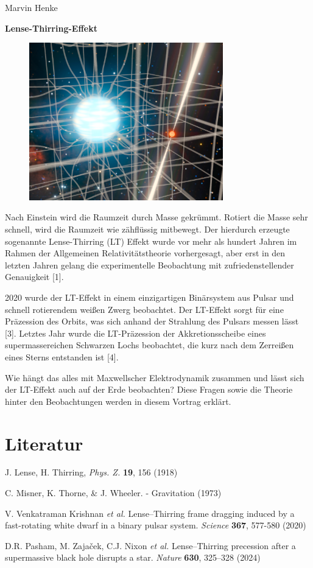 \documentclass[12pt,a4paper]{article}
\begin{document}
	Marvin Henke
	\begin{center}
		\LARGE \textbf{Lense-Thirring-Effekt}
	\end{center}
	
	\begin{figure}[ht]
		\centering
		\includegraphics[width=0.75\textwidth]{../lense_thirring_edited.png}
	\end{figure}
	
	\noindent
	Nach Einstein wird die Raumzeit durch Masse gekrümmt. Rotiert die Masse sehr schnell, wird die Raumzeit wie zähflüssig mitbewegt. Der hierdurch erzeugte sogenannte Lense-Thirring (LT) Effekt wurde vor mehr als hundert Jahren im Rahmen der Allgemeinen Relativitätstheorie vorhergesagt, aber erst in den letzten Jahren gelang die experimentelle Beobachtung mit zufriedenstellender Genauigkeit [1].
	
	2020 wurde der LT-Effekt in einem einzigartigen Binärsystem aus Pulsar und schnell rotierendem weißen Zwerg beobachtet. Der LT-Effekt sorgt für eine Präzession des Orbits, was sich anhand der Strahlung des Pulsars messen lässt [3].
	Letztes Jahr wurde die LT-Präzession der Akkretionsscheibe eines supermassereichen Schwarzen
	Lochs beobachtet, die kurz nach dem Zerreißen eines Sterns entstanden ist [4].
	
	Wie hängt das alles mit Maxwellscher Elektrodynamik zusammen und lässt sich der LT-Effekt auch auf der Erde beobachten? Diese Fragen sowie die Theorie hinter den Beobachtungen werden in diesem Vortrag erklärt.
	
	\section*{Literatur}
	\begin{enumerate}[label={[\arabic*]}]
		\item J. Lense, H. Thirring, \textit{Phys. Z.} \textbf{19}, 156 (1918)
		\item C. Misner, K. Thorne, \& J. Wheeler. - Gravitation (1973)
		\item V. Venkatraman Krishnan \textit{et al.} Lense–Thirring frame dragging induced by a fast-rotating white dwarf in a binary pulsar system. \textit{Science} \textbf{367}, 577-580 (2020)
		\item D.R. Pasham, M. Zajaček, C.J. Nixon \textit{et al.} Lense–Thirring precession after a supermassive black hole disrupts a star. \textit{Nature} \textbf{630}, 325–328 (2024)
	\end{enumerate}
	
	\thispagestyle{empty}
	
\end{document}
